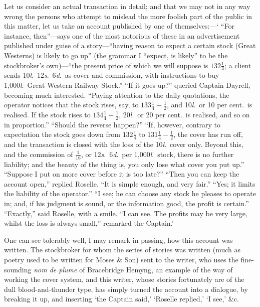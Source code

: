 \documentclass[letterpaper,12pt,oneside,openany]{memoir}
\begin{document}
Let us consider an actual transaction in detail; and
that we may not in any way wrong the persons who
attempt to mislead the more foolish part of the public
in this matter, let us take an account published by one
of themselves:---` ``For instance, then''---says one of the
most notorious of these in an advertisement published
under guise of a story---``having reason to expect a certain
stock (Great Westerns) is likely to go up'' (the
grammar I ``expect, is likely'' to be the stockbroker's
own)---``the present price of which we will suppose is
$132\frac{1}{4}$; a client sends 10\textit{l}.\ 12\textit{s}.\ 6\textit{d}.\ as cover and commission,
with instructions to buy 1,000\textit{l}.\ Great Western
Railway Stock.'' ``If it goes up?'' queried Captain Dayrell,
becoming much interested. ``Paying attention to
the daily quotations, the operator notices that the stock
rises, say, to $133\frac{1}{4} - \frac{1}{2}$, and 10\textit{l}.\ or 10 per cent.\ is realised.
If the stock rises to $134\frac{1}{4} - \frac{1}{2}$, 20\textit{l}.\ or 20 per cent.\ is
realised, and so on in proportion.'' ``Should the reverse
happen?'' ``If, however, contrary to expectation the
stock goes down from $132\frac{1}{4}$ to $131\frac{1}{4} - \frac{1}{2}$, the cover has
run off, and the transaction is closed with the loss of the
10\textit{l}.\ cover only. Beyond this, and the commission
of $\frac{1}{16}$, or 12\textit{s}.\ 6\textit{d}.\ per 1,000\textit{l}.\ stock, there is no further
liability; and the beauty of the thing is, you only lose
what cover you put up.'' ``Suppose I put on more
cover before it is too late?'' ``Then you can keep the
account open,'' replied Roselle. ``It is simple enough,
and very fair.'' ``Yes; it limits the liability of the
operator.'' ``I see; he can choose any stock he pleases
to operate in; and, if his judgment is sound, or the information
good, the profit is certain.'' ``Exactly,'' said
Roselle, with a smile. ``I can see. The profits may
be very large, whilst the loss is always small,'' remarked
the Captain.'

One can see tolerably well, I may remark in passing,
how this account was written. The stockbroker for
whom the series of stories was written (much as poetry
used to be written for Moses \& Son) sent to the writer,
who uses the fine-sounding \textit{nom de plume} of Bracebridge
Hemyng, an example of the way of working the cover
system, and this writer, whose stories fortunately are of
the dull blood-and-thunder type, has simply turned the
account into a dialogue, by breaking it up, and inserting
`the Captain said,' `Roselle replied,' `I see,' \&c.
\end{document}
